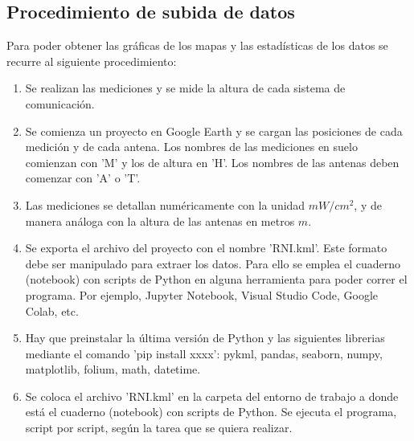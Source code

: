 \subsection{Procedimiento de subida de datos}
Para poder obtener las gráficas de los mapas y las estadísticas de los datos se recurre al siguiente procedimiento:

\begin{enumerate}
    \item Se realizan las mediciones y se mide la altura de cada sistema de comunicación.
    \item Se comienza un proyecto en Google Earth y se cargan las posiciones de cada medición y de cada antena. Los nombres de las mediciones en suelo comienzan con 'M' y los de altura en 'H'. Los nombres de las antenas deben comenzar con 'A' o 'T'. 
    \item Las mediciones se detallan numéricamente con la unidad $mW/cm^2$, y de manera análoga con la altura de las antenas en metros $m$.
    \item Se exporta el archivo del proyecto con el nombre 'RNI.kml'. Este formato debe ser manipulado para extraer los datos. Para ello se emplea el cuaderno (notebook) con scripts de Python en alguna herramienta para poder correr el programa. Por ejemplo, Jupyter Notebook, Visual Studio Code, Google Colab, etc. 
    \item Hay que preinstalar la última versión de Python y las siguientes librerias mediante el comando 'pip install xxxx': pykml, pandas, seaborn, numpy, matplotlib, folium, math, datetime. 
    \item Se coloca el archivo 'RNI.kml' en la carpeta del entorno de trabajo a donde está el cuaderno (notebook) con scripts de Python. Se ejecuta el programa, script por script, según la tarea que se quiera realizar.
\end{enumerate}

